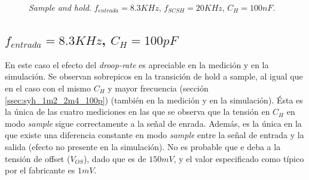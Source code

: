 \documentclass[../../ASSD_TP1_G7.tex]{subfiles}
\begin{document}
\begin{figure}[H]
	\centering
	\begin{subfigure}[t]{0.45\linewidth}
		
		\label{fig:syh_8k3_20k_100n_med}
	\end{subfigure}
	\begin{subfigure}[t]{0.45\linewidth}
		
		\label{fig:syh_8k3_20k_100n_sim}
	\end{subfigure}
	\caption{\textit{Sample and hold}. $f_{entrada} = 8.3KHz$, $f_{SCSH}=20KHz$, $C_H = 100nF$.}
	\label{fig:syh_8k3_20k_100n}
\end{figure}



%		



\subsection{$f_{entrada}=8.3KHz$, $C_H = 100pF$ }
En este caso el efecto del \textit{droop-rate} es apreciable en la medici\'on y en la simulaci\'on. Se observan sobrepicos en la transici\'on de hold a sample, al igual que en el caso con el mismo $C_H$ y mayor frecuencia (secci\'on \ref{ssec:syh_1m2_2m4_100p}) (tambi\'en en la medici\'on y en la simulaci\'on). \'Esta es la \'unica de las cuatro mediciones en las que se observa que la tensi\'on en $C_H$ en modo \textit{sample} sigue correctamente a la se\~nal de enrada. Adem\'as, es la \'unica en la que existe una diferencia constante en modo \textit{sample} entre la se\~nal de entrada y la salida (efecto no presente en la simulaci\'on). No es probable que e deba a la tensi\'on de offset ($V_{OS}$), dado que es de $150mV$, y el valor especificado como t\'ipico por el fabricante es $1mV$.
\end{document}
